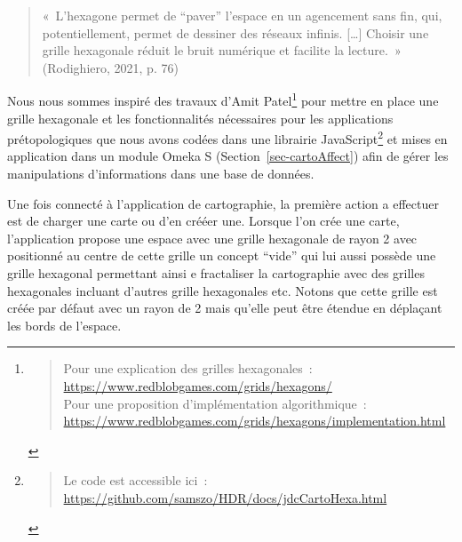 \documentclass[
  a4paper,
  DIV=11,
  numbers=noendperiod]{scrreprt}
\begin{document}
\begin{quote}
«~L'hexagone permet de ``paver'' l'espace en un agencement sans fin,
qui, potentiellement, permet de dessiner des réseaux infinis.
{[}\ldots{]} Choisir une grille hexagonale réduit le bruit numérique et
facilite la lecture.~» (Rodighiero, 2021, p. 76)
\end{quote}

Nous nous sommes inspiré des travaux d'Amit Patel\footnote{\begin{quote}
  Pour une explication des grilles hexagonales~:
  \url{https://www.redblobgames.com/grids/hexagons/}\\
  Pour une proposition d'implémentation algorithmique~:
  \url{https://www.redblobgames.com/grids/hexagons/implementation.html}
  \end{quote}} pour mettre en place une grille hexagonale et les
fonctionnalités nécessaires pour les applications prétopologiques que
nous avons codées dans une librairie JavaScript\footnote{\begin{quote}
  Le code est accessible ici~:
  \url{https://github.com/samszo/HDR/docs/jdcCartoHexa.html}
  \end{quote}} et mises en application dans un module Omeka S
(Section~\ref{sec-cartoAffect}) afin de gérer les manipulations
d'informations dans une base de données.

Une fois connecté à l'application de cartographie, la première action a
effectuer est de charger une carte ou d'en crééer une. Lorsque l'on crée
une carte, l'application propose une espace avec une grille hexagonale
de rayon 2 avec positionné au centre de cette grille un concept ``vide''
qui lui aussi possède une grille hexagonal permettant ainsi e
fractaliser la cartographie avec des grilles hexagonales incluant
d'autres grille hexagonales etc. Notons que cette grille est créée par
défaut avec un rayon de 2 mais qu'elle peut être étendue en déplaçant
les bords de l'espace.
\end{document}
